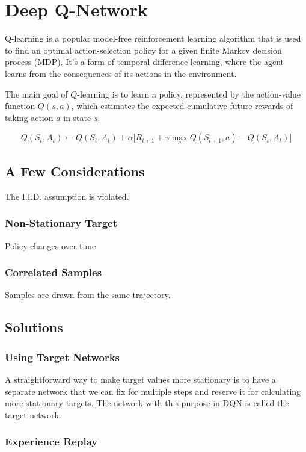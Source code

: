 \chapter{Deep Q-Network}
Q-learning is a popular model-free reinforcement learning algorithm that is used to find an optimal action-selection policy for a given finite Markov decision process (MDP). It's a form of temporal difference learning, where the agent learns from the consequences of its actions in the environment.

The main goal of $Q$-learning is to learn a policy, represented by the action-value function $Q(s,a)$, which estimates the expected cumulative future rewards of taking action $a$ in state $s$.


$$Q(S_t, A_t) \leftarrow Q(S_t, A_t)+ \alpha \Big[R_{t+1}+\gamma \max_a Q(S_{t+1}, a)-Q(S_t, A_t)\Big] $$





\section{A Few Considerations}

The I.I.D. assumption is violated. 

\subsection{Non-Stationary Target}
Policy changes over time

\subsection{Correlated Samples}
Samples are drawn from the same trajectory.


\section{Solutions}
\subsection{Using Target Networks}
A straightforward way to make target values more stationary is to have a separate network that we can fix for multiple steps and reserve it for calculating more stationary targets. The network with this purpose in DQN is called the target network.

\subsection{Experience Replay}

